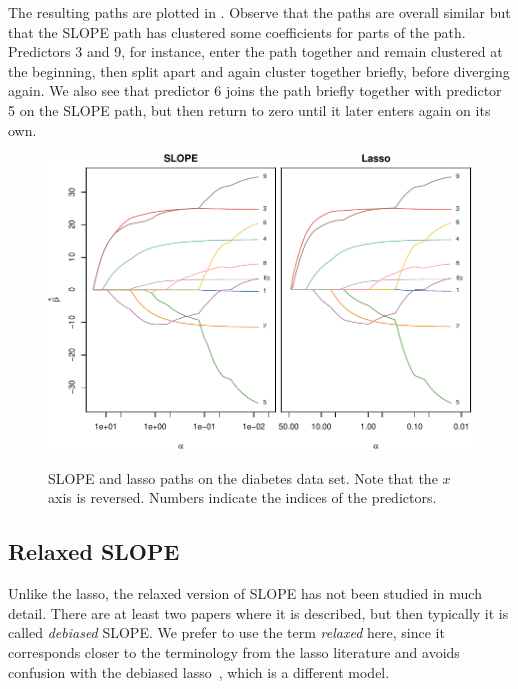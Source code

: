 \documentclass[article]{jss}
\makeatletter
\let\Cref\crtCref
\let\natwidth\Gin@nat@width
\makeatother
\begin{document}
The resulting paths are plotted in \Cref{fig:diabetes}. Observe that the
paths are overall similar but that the SLOPE path has clustered
some coefficients for parts of the path. Predictors 3 and 9, for instance,
enter the path together and remain clustered at the beginning, then
split apart and again cluster together briefly, before diverging again.
We also see that predictor 6 joins the path briefly together
with predictor 5 on the SLOPE path, but then return to zero until
it later enters again on its own.

\begin{figure}[tp]
  \centering
  {\includegraphics[width=\natwidth]{images/diabetes-slope-lasso.pdf}}
  \caption{%
    SLOPE and lasso paths on the diabetes
    data set. Note that the \(x\) axis is reversed. Numbers indicate
    the indices of the predictors.
  }
  \label{fig:diabetes}
\end{figure}


\subsection{Relaxed SLOPE}

Unlike the lasso, the relaxed version of SLOPE has not been studied in much detail.
There are at least two papers where it is described, but then typically it is
called \emph{debiased} SLOPE. We prefer to use the term \emph{relaxed} here,
since it corresponds closer to the terminology from the lasso literature and
avoids confusion with the debiased lasso~\citep{geer2014}, which is a different
model.
\end{document}
